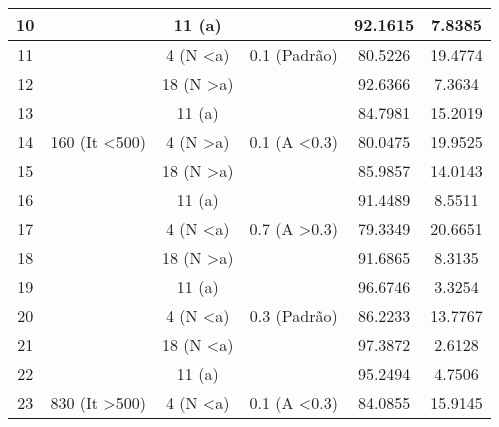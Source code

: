 \documentclass[
	article,			%
	11pt,				%
	oneside,			%
	a4paper,			%
	english,			%
	brazil,				%
	sumario=tradicional
	]{abntex2}
\begin{document}
\begin{table}[h]
\begin{tabular}{|c|c|c|c|c|c|}
		10 &                           & 11 (a)                &                          & 92.1615                    & 7.8385                   \\ \hline
		11 &                           & 4 (N \textless a)     & 0.1 (Padrão)             & 80.5226                    & 19.4774                  \\ \hline
		12 &                           & 18 (N \textgreater a) &                          & 92.6366                    & 7.3634                   \\ \hline
		13 &                           & 11 (a)                &                          & 84.7981                    & 15.2019                  \\ \hline
		14 & 160 (It \textless 500)    & 4 (N \textgreater a)  & 0.1 (A \textless 0.3)    & 80.0475                    & 19.9525                  \\ \hline
		15 &                           & 18 (N \textgreater a) &                          & 85.9857                    & 14.0143                  \\ \hline
		16 &                           & 11 (a)                &                          & 91.4489                    & 8.5511                   \\ \hline
		17 &                           & 4 (N \textless a)     & 0.7 (A \textgreater 0.3) & 79.3349                    & 20.6651                  \\ \hline
		18 &                           & 18 (N \textgreater a) &                          & 91.6865                    & 8.3135                   \\ \hline
		19 &                           & 11 (a)                &                          & 96.6746                    & 3.3254                   \\ \hline
		20 &                           & 4 (N \textless a)     & 0.3 (Padrão)             & 86.2233                    & 13.7767                  \\ \hline
		21 &                           & 18 (N \textless a)    &                          & 97.3872                    & 2.6128                   \\ \hline
		22 &                           & 11 (a)                &                          & 95.2494                    & 4.7506                   \\ \hline
		23 & 830 (It \textgreater 500) & 4 (N \textless a)     & 0.1 (A \textless 0.3)    & 84.0855                    & 15.9145                  \\ \hline

\end{tabular}
\end{table}
\end{document}
